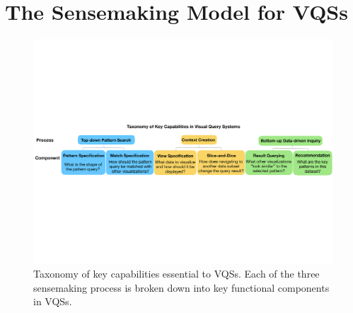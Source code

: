 \section{The Sensemaking Model for VQSs\label{sec:sensemaking}}
\begin{figure}[ht!]
  \centering
  \includegraphics[width=0.9\linewidth]{figures/taxonomy.pdf}
  \caption{Taxonomy of key capabilities essential to VQSs. Each of the three sensemaking process is broken down into key functional components in VQSs. } %
  \label{fig:taxonomy}
  \end{figure}
